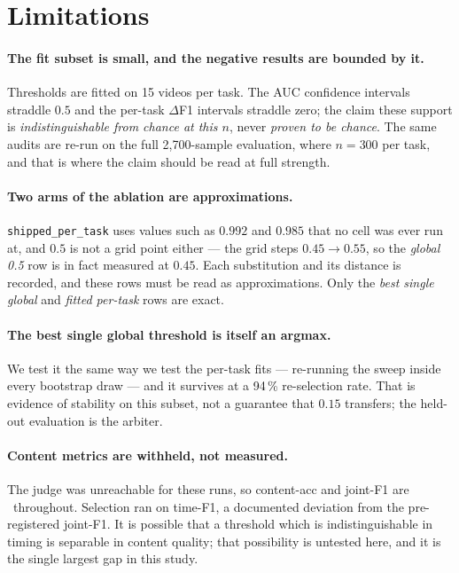 \section{Limitations}
\label{sec:limitations}

\paragraph{The fit subset is small, and the negative results are bounded by it.}
Thresholds are fitted on 15 videos per task. The AUC confidence intervals
straddle $0.5$ and the per-task $\Delta$F1 intervals straddle zero; the claim these
support is \emph{indistinguishable from chance at this $n$}, never \emph{proven to
be chance}. The same audits are re-run on the full 2{,}700-sample evaluation, where
$n=300$ per task, and that is where the claim should be read at full strength.

\paragraph{Two arms of the ablation are approximations.} \texttt{shipped\_per\_task}
uses values such as $0.992$ and $0.985$ that no cell was ever run at, and $0.5$ is
not a grid point either --- the grid steps $0.45 \to 0.55$, so the
\emph{global 0.5} row is in fact measured at $0.45$. Each substitution and its
distance is recorded, and these rows must be read as approximations. Only the
\emph{best single global} and \emph{fitted per-task} rows are exact.

\paragraph{The best single global threshold is itself an argmax.} We test it the
same way we test the per-task fits --- re-running the sweep inside every bootstrap
draw --- and it survives at a 94\,\% re-selection rate. That is evidence of
stability on this subset, not a guarantee that $0.15$ transfers; the held-out
evaluation is the arbiter.

\paragraph{Content metrics are withheld, not measured.} The judge was unreachable
for these runs, so content-acc and joint-F1 are \WITHHELD\ throughout. Selection
ran on time-F1, a documented deviation from the pre-registered joint-F1. It is
possible that a threshold which is indistinguishable in timing is separable in
content quality; that possibility is untested here, and it is the single largest
gap in this study.

